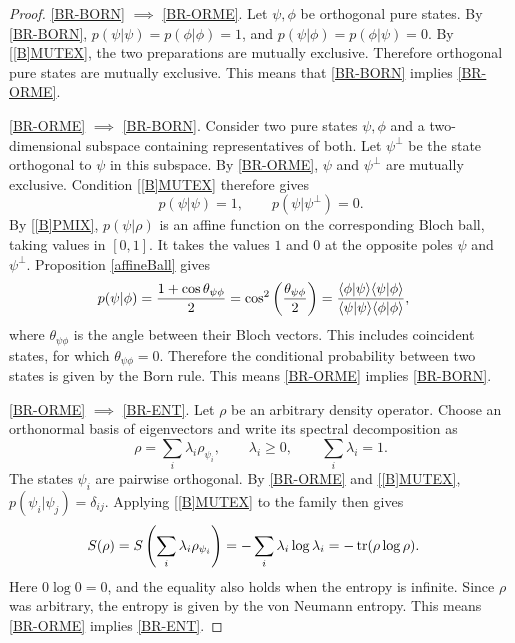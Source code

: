 \documentclass{techbrief}
\begin{document}
\begin{proof}
	\ref{BR-BORN} $\implies$ \ref{BR-ORME}.
	Let $\psi,\phi$ be orthogonal pure states. By \ref{BR-BORN}, $p(\psi|\psi)=p(\phi|\phi)=1$, and $p(\psi|\phi)=p(\phi|\psi)=0$.
	By \ref{[B]MUTEX}, the two preparations are mutually exclusive. Therefore orthogonal pure states are mutually exclusive. This means that \ref{BR-BORN} implies \ref{BR-ORME}.
	
	\ref{BR-ORME} $\implies$ \ref{BR-BORN}.
	Consider two pure states $\psi,\phi$ and a two-dimensional subspace containing representatives of both. Let $\psi^\perp$ be the state orthogonal to $\psi$ in this subspace. By \ref{BR-ORME}, $\psi$ and $\psi^\perp$ are mutually exclusive. Condition \ref{[B]MUTEX} therefore gives
	\begin{equation*}
		p(\psi|\psi)=1,
		\qquad
		p(\psi|\psi^\perp)=0.
	\end{equation*}
	By \ref{[B]PMIX}, $p(\psi|\rho)$ is an affine function on the corresponding Bloch ball, taking values in $[0,1]$. It takes the values $1$ and $0$ at the opposite poles $\psi$ and $\psi^\perp$. Proposition \ref{affineBall} gives
	\begin{equation*}
		\begin{aligned}
			p(\psi|\phi)
			&=\frac{1+\cos\theta_{\psi\phi}}{2}
			=\cos^2\left(\frac{\theta_{\psi\phi}}{2}\right)
			=\frac{\langle\phi|\psi\rangle\langle\psi|\phi\rangle}
			{\langle\psi|\psi\rangle\langle\phi|\phi\rangle},
		\end{aligned}
	\end{equation*}
	where $\theta_{\psi\phi}$ is the angle between their Bloch vectors. This includes coincident states, for which $\theta_{\psi\phi}=0$. Therefore the conditional probability between two states is given by the Born rule. This means \ref{BR-ORME} implies \ref{BR-BORN}.
	
	\ref{BR-ORME} $\implies$ \ref{BR-ENT}.
	Let $\rho$ be an arbitrary density operator. Choose an orthonormal basis of eigenvectors and write its spectral decomposition as
	\begin{equation*}
		\rho=\sum_i\lambda_i\rho_{\psi_i},
		\qquad
		\lambda_i\geq0,
		\qquad
		\sum_i\lambda_i=1.
	\end{equation*}
	The states $\psi_i$ are pairwise orthogonal. By \ref{BR-ORME} and \ref{[B]MUTEX}, $p(\psi_i|\psi_j)=\delta_{ij}$. Applying \ref{[B]MUTEX} to the family then gives
	\begin{equation*}
		\begin{aligned}
			S(\rho)
			&=S\left(\sum_i\lambda_i\rho_{\psi_i}\right)
			=-\sum_i\lambda_i\log\lambda_i =-\operatorname{tr}(\rho\log\rho).
		\end{aligned}
	\end{equation*}
	Here $0\log0=0$, and the equality also holds when the entropy is infinite. Since $\rho$ was arbitrary, the entropy is given by the von Neumann entropy. This means \ref{BR-ORME} implies \ref{BR-ENT}.
	

\end{proof}
\end{document}
